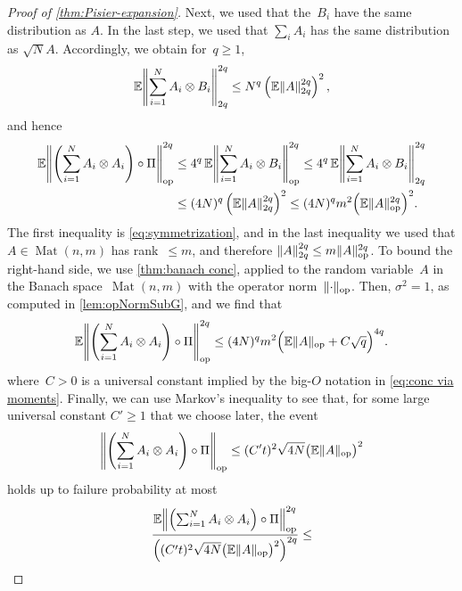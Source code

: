 \documentclass[aos]{imsart}
\theoremstyle{definition}
\numberwithin{equation}{section}
\DeclareMathOperator{\op}{op}
\DeclareMathOperator{\Mat}{Mat}
\DeclarePairedDelimiter{\norm}{\lVert}{\rVert}
\newcommand{\ot}{\otimes}
\newcommand{\E}{\mathbb{E}}
\begin{document}
\begin{appendix}
\begin{proof} [Proof of \cref{thm:Pisier-expansion}]
Next, we used that the~$B_i$ have the same distribution as $A$.
In the last step, we used that $\sum_i A_i$ has the same distribution as $\sqrt N A$.
Accordingly, we obtain for~$q\geq1$,
\begin{align*}
  \E \norm*{\sum_{i=1}^N A_i \ot B_i}_{2q}^{2q}
\leq N^q \left( \E\norm{A}_{2q}^{2q} \right)^2,
\end{align*}
and hence
\begin{align*}
\E \norm*{\left( \sum_{i=1}^N A_i \otimes A_i \right) \circ \Pi}_{\op}^{2q}
&\leq 4^q \, \E \norm*{\sum_{i=1}^N A_i \ot B_i}_{\op}^{2q}
\leq 4^q \, \E \norm*{\sum_{i=1}^N A_i \ot B_i}_{2q}^{2q} \\
&\leq (4N)^q \left( \E\norm{A}_{2q}^{2q} \right)^2
\leq (4N)^q m^2 \Bigl( \E\norm{A}_{\op}^{2q} \Bigr)^2.
\end{align*}
The first inequality is \cref{eq:symmetrization}, and in the last inequality we used that $A \in \Mat(n,m)$ has rank~$\leq m$, and therefore $\norm{A}_{2q}^{2q} \leq m \norm A_{\op}^{2q}$.
To bound the right-hand side, we use \cref{thm:banach conc}, applied to the random variable~$A$ in the Banach space~$\Mat(n,m)$ with the operator norm~$\norm{\cdot}_{\op}$.
Then, $\sigma^2=1$, as computed in \cref{lem:opNormSubG}, and we find that
\begin{align*}
\E \norm*{\left( \sum_{i=1}^N A_i \otimes A_i \right) \circ \Pi}_{\op}^{2q}
\leq (4 N)^q m^2 \Bigl( \E\norm A_{\op} + C \sqrt{q} \Bigr)^{4q}.
\end{align*}
where~$C>0$ is a universal constant implied by the big-$O$ notation in \cref{eq:conc via moments}.
Finally, we can use Markov's inequality to see that, for some large universal constant $C' \geq 1$ that we choose later, the event
\begin{align}\label{eq:desired event}
  \norm*{\left(\sum_{i=1}^N A_i \otimes A_i \right) \circ \Pi}_{\op}
  \leq (C' t)^2 \sqrt{4 N} \bigl( \E \norm{A}_{\op} \bigr)^2
\end{align}
holds up to failure probability at most
\begin{align*}
  \frac{\E \norm*{\left(\sum_{i=1}^N A_i \otimes A_i \right) \circ \Pi}_{\op}^{2q}}{\left( (C' t)^2 \sqrt{4 N} \bigl( \E \norm{A}_{\op} \bigr)^2 \right)^{2q}}
\leq %

\end{align*}
\end{proof}
\end{appendix}
\end{document}
